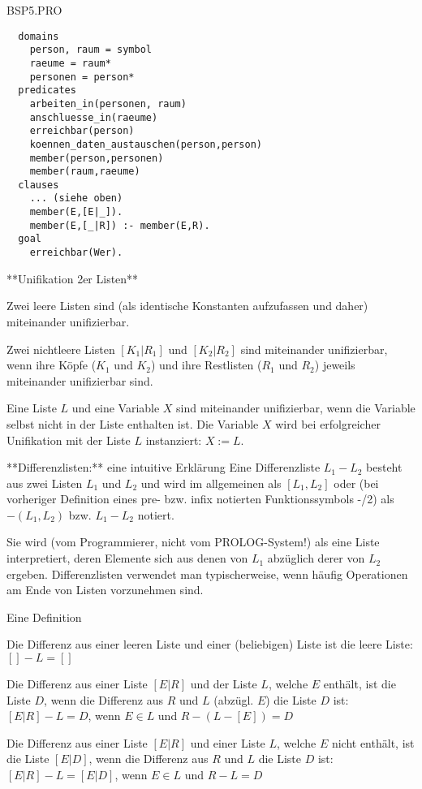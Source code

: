 \documentclass[a4paper]{article}
\begin{document}
\begin{multicols}{3}
  BSP5.PRO
  \begin{lstlisting}
  domains
    person, raum = symbol
    raeume = raum*
    personen = person*
  predicates
    arbeiten_in(personen, raum)
    anschluesse_in(raeume)
    erreichbar(person)
    koennen_daten_austauschen(person,person)
    member(person,personen)
    member(raum,raeume)
  clauses
    ... (siehe oben)
    member(E,[E|_]).
    member(E,[_|R]) :- member(E,R).
  goal
    erreichbar(Wer).
  \end{lstlisting}

  **Unifikation 2er Listen**
  \begin{enumerate*}
    \item Zwei leere Listen sind (als identische Konstanten aufzufassen und daher) miteinander unifizierbar.
    \item Zwei nichtleere Listen $[K_1|R_1]$ und $[K_2|R_2]$ sind miteinander unifizierbar, wenn ihre Köpfe ($K_1$ und $K_2$) und ihre Restlisten ($R_1$ und $R_2$) jeweils miteinander unifizierbar sind.
    \item Eine Liste $L$ und eine Variable $X$ sind miteinander unifizierbar, wenn die Variable selbst nicht in der Liste enthalten ist. Die Variable $X$ wird bei erfolgreicher Unifikation mit der Liste $L$ instanziert: $X:=L$.
  \end{enumerate*}

  **Differenzlisten:** eine intuitive Erklärung
  Eine Differenzliste $L_1 - L_2$ besteht aus zwei Listen $L_1$ und $L_2$ und wird im allgemeinen als $[L_1,L_2]$ oder (bei vorheriger Definition eines pre- bzw. infix notierten Funktionssymbols
  -/2) als $-(L_1,L_2)$ bzw. $L_1-L_2$ notiert.

  Sie wird (vom Programmierer, nicht vom PROLOG-System!) als eine Liste interpretiert, deren Elemente sich aus denen von $L_1$ abzüglich derer von $L_2$ ergeben. Differenzlisten verwendet man typischerweise, wenn häufig Operationen am Ende von Listen vorzunehmen sind.

  Eine Definition
  \begin{enumerate*}
    \item Die Differenz aus einer leeren Liste und einer (beliebigen) Liste ist die leere Liste: $[] - L = []$
    \item Die Differenz aus einer Liste $[E|R]$ und der Liste $L$, welche $E$ enthält, ist die Liste $D$,
    wenn die Differenz aus $R$ und $L$ (abzügl. $E$) die Liste $D$ ist: $[E|R]-L = D$, wenn $E\in L$ und $R-(L-[E]) = D$
    \item Die Differenz aus einer Liste $[E|R]$ und einer Liste $L$, welche $E$ nicht enthält, ist die Liste $[E|D]$, wenn die Differenz aus $R$ und $L$ die Liste $D$ ist: $[E|R] - L = [E|D]$, wenn $E\in L$ und $R-L=D$
  \end{enumerate*}


\end{multicols}
\end{document}

